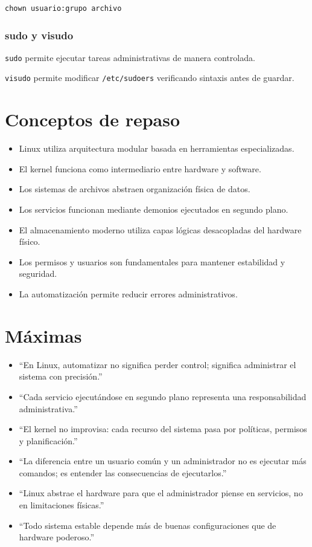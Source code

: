 \documentclass[11pt, letterpaper]{article}
\begin{document}
\begin{verbatim}
chown usuario:grupo archivo
\end{verbatim}
\subsubsection{sudo y visudo}
\label{sec:orgac2c667}

\texttt{sudo} permite ejecutar tareas administrativas de manera controlada.

\texttt{visudo} permite modificar \texttt{/etc/sudoers} verificando sintaxis antes de guardar.

\newpage
\section{Conceptos de repaso}
\label{sec:orgc430f38}

\begin{itemize}
\item Linux utiliza arquitectura modular basada en herramientas especializadas.
\item El kernel funciona como intermediario entre hardware y software.
\item Los sistemas de archivos abstraen organización física de datos.
\item Los servicios funcionan mediante demonios ejecutados en segundo plano.
\item El almacenamiento moderno utiliza capas lógicas desacopladas del hardware físico.
\item Los permisos y usuarios son fundamentales para mantener estabilidad y seguridad.
\item La automatización permite reducir errores administrativos.
\end{itemize}
\section{Máximas}
\label{sec:orge55c9d9}

\begin{itemize}
\item “En Linux, automatizar no significa perder control; significa administrar el sistema con precisión.”
\item “Cada servicio ejecutándose en segundo plano representa una responsabilidad administrativa.”
\item “El kernel no improvisa: cada recurso del sistema pasa por políticas, permisos y planificación.”
\item “La diferencia entre un usuario común y un administrador no es ejecutar más comandos; es entender las consecuencias de ejecutarlos.”
\item “Linux abstrae el hardware para que el administrador piense en servicios, no en limitaciones físicas.”
\item “Todo sistema estable depende más de buenas configuraciones que de hardware poderoso.”
\end{itemize}
\end{document}
